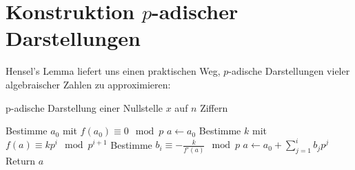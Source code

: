 \documentclass{report}
\newcommand*{\newpar}{\par\vspace{\baselineskip}\noindent}
\begin{document}
	\section{Konstruktion $p$-adischer Darstellungen}
	Hensel's Lemma liefert uns einen praktischen Weg, $p$-adische Darstellungen vieler algebraischer Zahlen zu approximieren:
	\begin{algorithm}
		\caption{p-adische Darstellung einer Nullstelle $x$ auf $n$ Ziffern}
		\begin{algorithmic}[1]
			\State Bestimme $a_0$ mit $f(a_0) \equiv 0 \mod p$
			\State $a \gets a_0$
				\State Bestimme $k$ mit $f(a) \equiv kp^i \mod p^{i+1}$
				\State Bestimme $\displaystyle b_i \equiv - \frac{k}{f'(a)} \mod p$ 
				\State $\displaystyle a \gets a_0 + \sum_{j = 1}^i b_jp^j$
			\EndFor
			\State Return $a$
		\end{algorithmic}
	\end{algorithm}
	\iffalse
	\begin{application}
		Wir wollen die $2$-adische Darstellung von $-1$ bestimmen. Wir zeigen Induktiv, dass jede Ziffer $1$ ist. Wir betrachten zuerst das Polynom $f(x) = x + 1$. Es gilt $f'(x) = 1 \not\equiv 0 \mod 2$. Es gilt außerdem $f(1) = 2 \equiv 0 \mod 2$. Wähle also $a_0 = 1$.
		\newpar
		Es gilt $f(1) = 2 \overset{!}{\equiv} k \cdot 2 \mod 2^2 \implies k = 1$, also $b_1 \equiv -1 \mod 2 = 1$. Sei nun angenommen, $a_0 = \hdots = a_{n-1} = 1$. Dann gilt:
		\begin{align*}
			f(b_{n-1}2^{n-1} + \hdots + b_1 2 + a_0) = f\left(\sum_{i = 1}^{n-1} 2^i\right) = 2^n - 1 + 1 = 2^n \overset{!}{\equiv} k \cdot 2^{n} \mod 2^{n+1}
		\end{align*}
		also wieder $k = 1$ und $b_n = 1$.
		\newpar
		Die $2$-adische Darstellung von $-1$ ist also $\hdots11111$.
	\end{application}
	\begin{application}
		Bezug zum Zweierkomplement in der Informatik.
	\end{application}
	\begin{proposition}
		In der $p$-adische Darstellung von $-1$ ist jede Ziffer $p-1$. Die $5$-adische Darstellung ist also $\hdots44444$, die $7$-adische Darstellung ist $\hdots66666$, und so weiter.
	\end{proposition}
	\fi
\end{document}
